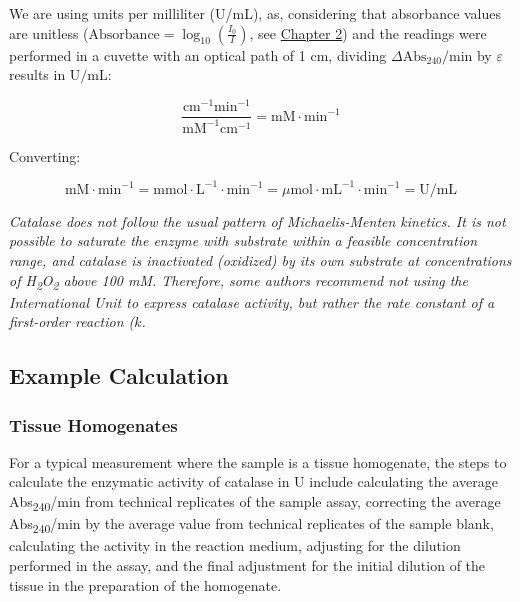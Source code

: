 \documentclass[
  9pt,
  american,
  a5paper,
  extrafontsizes,onecolumn,openright
  ]{memoir}
\newlength{\rf}
\begin{document}
We are using units per milliliter (U/mL), as, considering that absorbance values are unitless (\(\text{Absorbance} = \log_{10} \left( \frac{I_0}{I} \right)\), see \hyperref[chapter2]{Chapter 2}) and the readings were performed in a cuvette with an optical path of 1 cm, dividing \(\Delta \text{Abs}_{240}/\text{min}\) by \(\varepsilon\) results in \(\text{U/mL}\):

\[ \frac{\text{cm}^{-1}\text{min}^{-1}}{\text{mM}^{-1}\text{cm}^{-1}} = \text{mM} \cdot \text{min}^{-1} \]

Converting:

\[ \text{mM} \cdot \text{min}^{-1} = \text{mmol} \cdot \text{L}^{-1} \cdot \text{min}^{-1} = \mu\text{mol} \cdot \text{mL}^{-1} \cdot \text{min}^{-1} = \text{U/mL} \]

\begin{greybox}[frametitle = Note]
\emph{Catalase does not follow the usual pattern of Michaelis-Menten kinetics. It is not possible to saturate the enzyme with substrate within a feasible concentration range, and catalase is inactivated (oxidized) by its own substrate at concentrations of H\textsubscript{2}O\textsubscript{2} above 100 mM. Therefore, some authors recommend not using the International Unit to express catalase activity, but rather the rate constant of a first-order reaction (\(k\).}

\end{greybox}

\subsection{Example Calculation}\label{example-calculation}

\subsubsection{Tissue Homogenates}\label{tissue-homogenates}

For a typical measurement where the sample is a tissue homogenate, the steps to calculate the enzymatic activity of catalase in U include calculating the average Abs\textsubscript{240}/min from technical replicates of the sample assay, correcting the average Abs\textsubscript{240}/min by the average value from technical replicates of the sample blank, calculating the activity in the reaction medium, adjusting for the dilution performed in the assay, and the final adjustment for the initial dilution of the tissue in the preparation of the homogenate.
\end{document}
